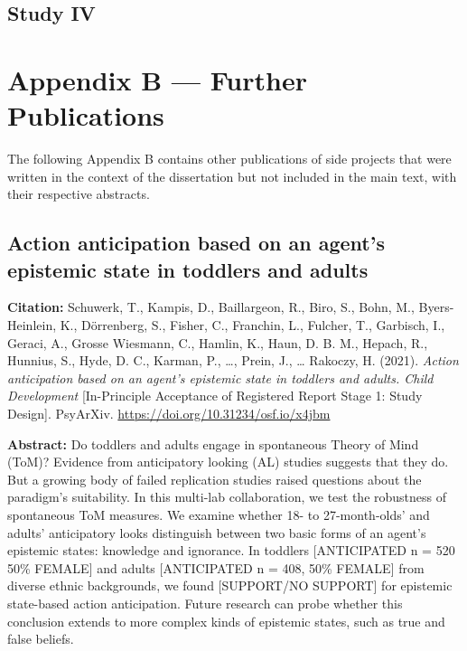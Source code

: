 \documentclass[
]{scrbook}
\begin{document}


\newpage

\section*{Study IV}\label{studyIV}

\begin{minipage}{\textwidth}

\end{minipage}



\chapter*{Appendix B --- Further Publications}\label{appendixB}

The following Appendix B contains other publications of side projects that were written in the context of the dissertation but not included in the main text, with their respective abstracts.

\section*{Action anticipation based on an agent's epistemic state in toddlers and adults}\label{manybabies}

\textbf{Citation:} Schuwerk, T., Kampis, D., Baillargeon, R., Biro, S., Bohn, M., Byers-Heinlein, K., Dörrenberg, S., Fisher, C., Franchin, L., Fulcher, T., Garbisch, I., Geraci, A., Grosse Wiesmann, C., Hamlin, K., Haun, D. B. M., Hepach, R., Hunnius, S., Hyde, D. C., Karman, P., \ldots, Prein, J., \ldots{} Rakoczy, H. (2021). \emph{Action anticipation based on an agent's epistemic state in toddlers and adults. Child Development} {[}In-Principle Acceptance of Registered Report Stage 1: Study Design{]}. PsyArXiv. \mbox{\url{https://doi.org/10.31234/osf.io/x4jbm}}

\textbf{Abstract:} Do toddlers and adults engage in spontaneous Theory of Mind (ToM)? Evidence from anticipatory looking (AL) studies suggests that they do. But a growing body of failed replication studies raised questions about the paradigm's suitability. In this multi-lab collaboration, we test the robustness of spontaneous ToM measures. We examine whether 18- to 27-month-olds' and adults' anticipatory looks distinguish between two basic forms of an agent's epistemic states: knowledge and ignorance. In toddlers {[}ANTICIPATED n = 520 50\% FEMALE{]} and adults {[}ANTICIPATED n = 408, 50\% FEMALE{]} from diverse ethnic backgrounds, we found {[}SUPPORT/NO SUPPORT{]} for epistemic state-based action anticipation. Future research can probe whether this conclusion extends to more complex kinds of epistemic states, such as true and false beliefs.
\end{document}
